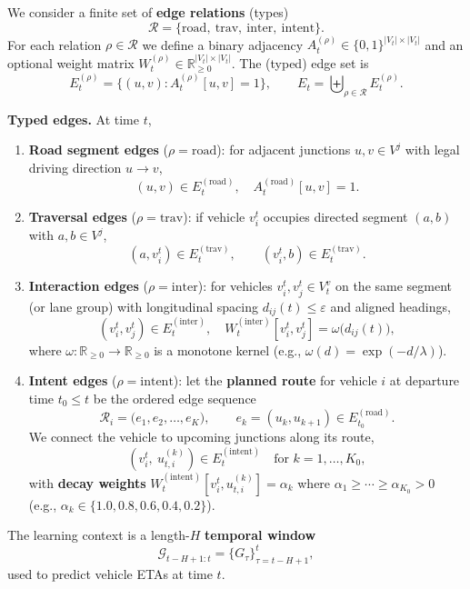\documentclass[
  10pt,
  letterpaper,
  lettersize,
  journal]{IEEEtran}
\begin{document}
We consider a finite set of \textbf{edge relations} (types)
\[\mathcal{R}=\{\text{road},\ \text{trav},\ \text{inter},\ \text{intent}\}.\]
For each relation \(\rho\in\mathcal{R}\) we define a binary adjacency
\(A_t^{(\rho)}\in\{0,1\}^{|V_t|\times |V_t|}\) and an optional weight
matrix \(W_t^{(\rho)}\in\mathbb{R}_{\ge 0}^{|V_t|\times |V_t|}\). The
(typed) edge set is
\[E_t^{(\rho)}=\{(u,v): A_t^{(\rho)}[u,v]=1\},\qquad E_t=\biguplus_{\rho\in\mathcal{R}}E_t^{(\rho)}.\]

\textbf{Typed edges.} At time \(t\),

\begin{enumerate}
\def\labelenumi{\arabic{enumi})}
\item
  \textbf{Road segment edges} (\(\rho=\text{road}\)): for adjacent
  junctions \(u,v\in V^{j}\) with legal driving direction \(u\!\to\!v\),
  \[(u,v)\in E^{(\text{road})}_t,\quad A_t^{(\text{road})}[u,v]=1.\]
\item
  \textbf{Traversal edges} (\(\rho=\text{trav}\)): if vehicle
  \(v_i^{t}\) occupies directed segment \((a,b)\) with \(a,b\in V^{j}\),
  \[(a, v_i^{t})\in E_t^{(\text{trav})},\qquad (v_i^{t}, b)\in E_t^{(\text{trav})}.\]
\item
  \textbf{Interaction edges} (\(\rho=\text{inter}\)): for vehicles
  \(v_i^{t}, v_{j}^{t}\in V_t^{v}\) on the same segment (or lane group)
  with longitudinal spacing \(d_{ij}(t)\le \varepsilon\) and aligned
  headings,
  \[(v_i^{t}, v_{j}^{t})\in E_t^{(\text{inter})},\quad W_t^{(\text{inter})}[v_i^{t},v_{j}^{t}]=\omega\!\big(d_{ij}(t)\big),\]
  where \(\omega:\mathbb{R}_{\ge 0}\!\to\!\mathbb{R}_{\ge 0}\) is a
  monotone kernel (e.g., \(\omega(d)=\exp(-d/\lambda)\)).
\item
  \textbf{Intent edges} (\(\rho=\text{intent}\)): let the
  \textbf{planned route} for vehicle \(i\) at departure time
  \(t_0\le t\) be the ordered edge sequence
  \[\mathcal{R}_{i}=\big(e_1,e_2,\ldots,e_{K}\big),\qquad e_k=(u_k,u_{k+1})\in E^{(\text{road})}_{t_0}.\]
  We connect the vehicle to upcoming junctions along its route,
  \[(v_i^{t},\ u_{t,i}^{(k)})\in E_t^{(\text{intent})}\quad \text{for }k=1,\ldots,K_0,\]
  with \textbf{decay weights}
  \(W_t^{(\text{intent})}[v_i^{t},u_{t,i}^{(k)}]=\alpha_k\) where
  \(\alpha_1\ge\cdots\ge \alpha_{K_0}>0\) (e.g.,
  \(\alpha_k\in\{1.0,0.8,0.6,0.4,0.2\}\)).
\end{enumerate}

The learning context is a length-\(H\) \textbf{temporal window}
\[\mathcal{G}_{t-H+1:t}=\big\{G_{\tau}\big\}_{\tau=t-H+1}^{t},\] used to
predict vehicle ETAs at time \(t\).
\end{document}
